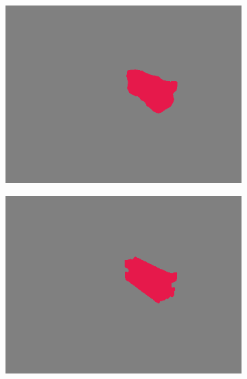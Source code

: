 \begin{figure}[h]
\begin{subfigure}{.24\textwidth}
			\includegraphics[width=1\linewidth]{images/sample_predictions/s40_40_G_013_mob_shape_pred}
		\end{subfigure}
		\begin{subfigure}{.24\textwidth}
			\centering
			\includegraphics[width=1\linewidth]{images/sample_predictions/s40_40_G_013_xcep_shape_pred}
		\end{subfigure}
		\begin{subfigure}{.24\textwidth}
			\centering

\end{subfigure}
\end{figure}
